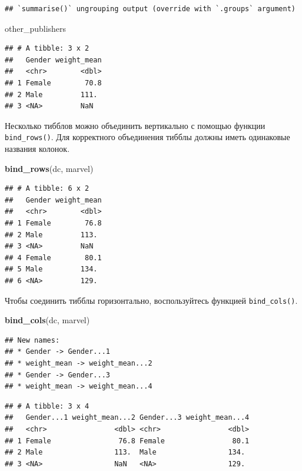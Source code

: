 \documentclass[]{book}
\newenvironment{Shaded}{\begin{snugshade}}{\end{snugshade}}
\newcommand{\KeywordTok}[1]{\textcolor[rgb]{0.13,0.29,0.53}{\textbf{#1}}}
\newcommand{\NormalTok}[1]{#1}
\begin{document}
\begin{verbatim}
## `summarise()` ungrouping output (override with `.groups` argument)
\end{verbatim}

\begin{Shaded}
\begin{Highlighting}[]
\NormalTok{other_publishers}
\end{Highlighting}
\end{Shaded}

\begin{verbatim}
## # A tibble: 3 x 2
##   Gender weight_mean
##   <chr>        <dbl>
## 1 Female        70.8
## 2 Male         111. 
## 3 <NA>         NaN
\end{verbatim}

Несколько тибблов можно объединить вертикально с помощью функции
\texttt{bind\_rows()}. Для корректного объединения тибблы должны иметь
одинаковые названия колонок.

\begin{Shaded}
\begin{Highlighting}[]
\KeywordTok{bind_rows}\NormalTok{(dc, marvel)}
\end{Highlighting}
\end{Shaded}

\begin{verbatim}
## # A tibble: 6 x 2
##   Gender weight_mean
##   <chr>        <dbl>
## 1 Female        76.8
## 2 Male         113. 
## 3 <NA>         NaN  
## 4 Female        80.1
## 5 Male         134. 
## 6 <NA>         129.
\end{verbatim}

Чтобы соединить тибблы горизонтально, воспользуйтесь функцией
\texttt{bind\_cols()}.

\begin{Shaded}
\begin{Highlighting}[]
\KeywordTok{bind_cols}\NormalTok{(dc, marvel)}
\end{Highlighting}
\end{Shaded}

\begin{verbatim}
## New names:
## * Gender -> Gender...1
## * weight_mean -> weight_mean...2
## * Gender -> Gender...3
## * weight_mean -> weight_mean...4
\end{verbatim}

\begin{verbatim}
## # A tibble: 3 x 4
##   Gender...1 weight_mean...2 Gender...3 weight_mean...4
##   <chr>                <dbl> <chr>                <dbl>
## 1 Female                76.8 Female                80.1
## 2 Male                 113.  Male                 134. 
## 3 <NA>                 NaN   <NA>                 129.
\end{verbatim}
\end{document}
